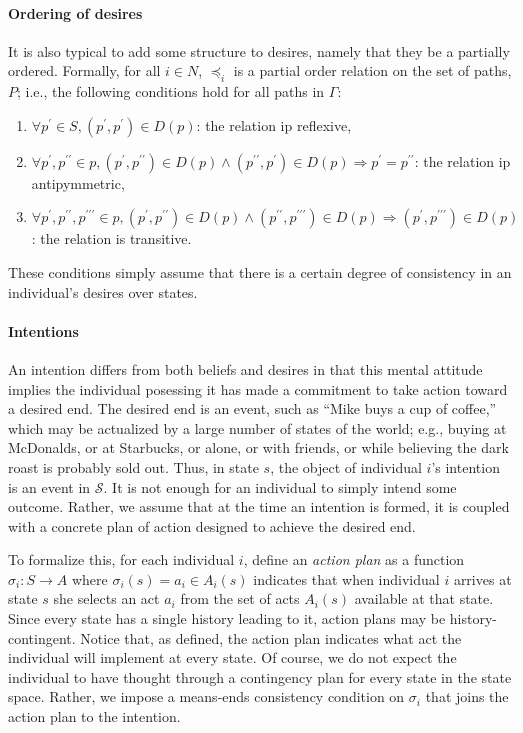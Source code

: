 \documentclass[
11pt,
titlepage,
reqno,
]{article}%
\theoremstyle{definition}
\begin{document}
	\paragraph{Ordering of desires \label{para: desire ordering}} 
	It is also typical to add some structure to desires, namely that they be a partially ordered. 
	Formally, for all $i\in N$, $\preceq_i$ is a partial order relation on the set of paths, $P$; i.e., the following conditions hold for all paths in $\Gamma$:
	\begin{enumerate}
		\item $\forall  p^\prime\in S, (p^\prime,p^\prime)\in D(p)$: the relation ip reflexive,
		\item $\forall  p^\prime,p^{\prime\prime}\in p,(p^\prime,p^{\prime\prime})\in D(p)\wedge (p^{\prime\prime},p^\prime)\in D(p)\Rightarrow p^\prime=p^{\prime\prime}$: the relation ip antipymmetric,
		\item $\forall  p^\prime, p^{\prime\prime}, p^{\prime\prime\prime}\in p, (p^\prime,p^{\prime\prime})\in D(p)\wedge (p^{\prime\prime},p^{\prime\prime\prime})\in D(p)\Rightarrow  (p^{\prime},p^{\prime\prime\prime})\in D(p)$: the relation is transitive.
	\end{enumerate} 
	These conditions simply assume that there is a certain degree of consistency in an individual's desires over states. 
	
	\paragraph{Intentions\label{para: intentons}} 
	An intention differs from both beliefs and desires in that this mental attitude implies the individual posessing it has made a commitment to take action toward a desired end. 
	The desired end is an event, such as ``Mike buys a cup of coffee,'' which may be actualized by a large number of states of the world; e.g., buying at McDonalds, or at Starbucks, or alone, or with friends, or while believing the dark roast is probably sold out. Thus, in state $s$, the object of individual $i$'s intention is an event in $\mathcal{S}$. 
	It is not enough for an individual to simply intend some outcome. 
	Rather, we assume that at the time an intention is formed, it is coupled with a concrete plan of action designed to achieve the desired end. 
	
	To formalize this, for each individual $i$, define an \textit{action plan} as a function $\sigma_i:S\rightarrow A$ where $\sigma_i(s)=a_i\in A_i(s)$ indicates that when individual $i$ arrives at state $s$ she selects an act $a_i$ from the set of acts $A_i(s)$ available at that state. 
	Since every state has a single history leading to it, action plans may be history-contingent.
	Notice that, as defined, the action plan indicates what act the individual will implement at every state. 
	Of course, we do not expect the individual to have thought through a contingency plan for every state in the state space. 
	Rather, we impose a means-ends consistency condition on $\sigma_i$ that joins the action plan to the intention.
	
\end{document}
